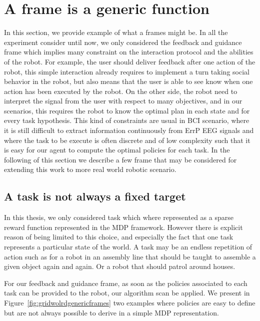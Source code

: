 
\section{A frame is a generic function}
\label{chapter:limitations:framegeneric}

In this section, we provide example of what a frames might be. In all the experiment consider until now, we only considered the feedback and guidance frame which implies many constraint on the interaction protocol and the abilities of the robot. For example, the user should deliver feedback after one action of the robot, this simple interaction already requires to implement a turn taking social behavior in the robot, but also means that the user is able to see know when one action has been executed by the robot. On the other side, the robot need to interpret the signal from the user with respect to many objectives, and in our scenarios, this requires the robot to know the optimal plan in each state and for every task hypothesis. This kind of constraints are usual in BCI scenario, where it is still difficult to extract information continuously from ErrP EEG signals and where the task to be execute is often discrete and of low complexity such that it is easy for our agent to compute the optimal policies for each task. In the following of this section we describe a few frame that may be considered for extending this work to more real world robotic scenario.

\subsection{A task is not always a fixed target}

In this thesis, we only considered task which where represented as a sparse reward function represented in the MDP framework. However there is explicit reason of being limited to this choice, and especially the fact that one task represents a particular state of the world. A task may be an endless repetition of action such as for a robot in an assembly line that should be taught to assemble a given object again and again. Or a robot that should patrol around houses. 

For our feedback and guidance frame, as soon as the policies associated to each task can be provided to the robot, our algorithm scan be applied. We present in Figure~\ref{fig:gridwolrdgenericframes} two examples where policies are easy to define but are not always possible to derive in a simple MDP representation.

